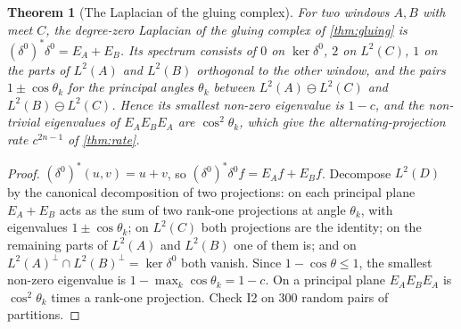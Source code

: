 \documentclass[11pt]{article}
\newtheorem{theorem}{Theorem}[section]
\theoremstyle{definition}
\begin{document}
\begin{theorem}[The Laplacian of the gluing complex]\label{thm:laplacian}
For two windows $A,B$ with meet $C$, the degree-zero Laplacian of the gluing complex of \cref{thm:gluing} is
$(\delta^0)^*\delta^0=E_A+E_B$. Its spectrum consists of $0$ on $\ker\delta^0$, $2$ on $L^2(C)$, $1$ on the parts of $L^2(A)$ and $L^2(B)$
orthogonal to the other window, and the pairs $1\pm\cos\theta_k$ for the principal angles $\theta_k$ between $L^2(A)\ominus L^2(C)$ and
$L^2(B)\ominus L^2(C)$. Hence its smallest non-zero eigenvalue is $1-c$, and the non-trivial eigenvalues of $E_AE_BE_A$ are $\cos^2\theta_k$,
which give the alternating-projection rate $c^{2n-1}$ of \cref{thm:rate}.
\end{theorem}
\begin{proof}
$(\delta^0)^*(u,v)=u+v$, so $(\delta^0)^*\delta^0f=E_Af+E_Bf$. Decompose $L^2(D)$ by the canonical decomposition of two projections:
on each principal plane $E_A+E_B$ acts as the sum of two rank-one projections at angle $\theta_k$, with eigenvalues $1\pm\cos\theta_k$;
on $L^2(C)$ both projections are the identity; on the remaining parts of $L^2(A)$ and $L^2(B)$ one of them is; and on
$L^2(A)^\perp\cap L^2(B)^\perp=\ker\delta^0$ both vanish. Since $1-\cos\theta\le1$, the smallest non-zero eigenvalue is $1-\max_k\cos\theta_k=1-c$.
On a principal plane $E_AE_BE_A$ is $\cos^2\theta_k$ times a rank-one projection. Check I2 on 300 random pairs of partitions.
\end{proof}
\end{document}
